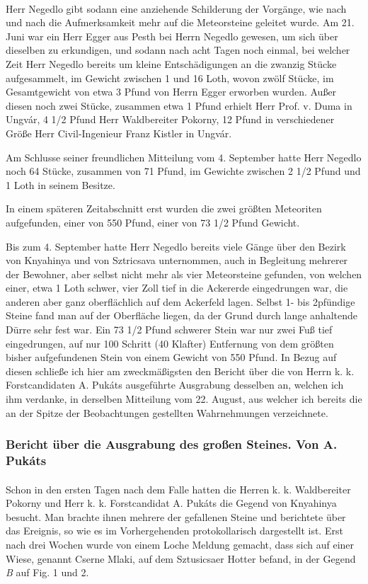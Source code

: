 \documentclass[a4paper, 11pt, oneside, german]{article}
\begin{document}
\paragraph{}
Herr Negedlo gibt sodann eine anziehende Schilderung der Vorgänge, wie nach und nach die Aufmerksamkeit mehr auf die Meteorsteine geleitet wurde. Am 21. Juni war ein Herr Egger aus Pesth bei Herrn Negedlo gewesen, um sich über dieselben zu erkundigen, und sodann nach acht Tagen noch einmal, bei welcher Zeit Herr Negedlo bereits um kleine Entschädigungen an die zwanzig Stücke aufgesammelt, im Gewicht zwischen 1 und 16 Loth, wovon zwölf Stücke, im Gesamtgewicht von etwa 3 Pfund von Herrn Egger erworben wurden. Außer diesen noch zwei Stücke, zusammen etwa 1 Pfund erhielt Herr Prof. v. Duma in Ungvár, 4 1/2 Pfund Herr Waldbereiter Pokorny, 12 Pfund in verschiedener Größe Herr Civil-Ingenieur Franz Kistler in Ungvár.

Am Schlusse seiner freundlichen Mitteilung vom 4. September hatte Herr Negedlo noch 64 Stücke, zusammen von 71 Pfund, im Gewichte zwischen 2 1/2 Pfund und 1 Loth in seinem Besitze.

In einem späteren Zeitabschnitt erst wurden die zwei größten Meteoriten aufgefunden, einer von 550 Pfund, einer von 73 1/2 Pfund Gewicht.

Bis zum 4. September hatte Herr Negedlo bereits viele Gänge über den Bezirk von Knyahinya und von Sztricsava unternommen, auch in Begleitung mehrerer der Bewohner, aber selbst nicht mehr als vier Meteorsteine gefunden, von welchen einer, etwa 1 Loth schwer, vier Zoll tief in die Ackererde eingedrungen war, die anderen aber ganz oberflächlich auf dem Ackerfeld lagen. Selbst 1- bis 2pfündige Steine fand man auf der Oberfläche liegen, da der Grund durch lange anhaltende Dürre sehr fest war. Ein 73 1/2 Pfund schwerer Stein war nur zwei Fuß tief eingedrungen, auf nur 100 Schritt (40 Klafter) Entfernung von dem größten bisher aufgefundenen Stein von einem Gewicht von 550 Pfund. In Bezug auf diesen schließe ich hier am zweckmäßigsten den Bericht über die von Herrn k. k. Forstcandidaten A. Pukáts ausgeführte Ausgrabung desselben an, welchen ich ihm verdanke, in derselben Mitteilung vom 22. August, aus welcher ich bereits die an der Spitze der Beobachtungen gestellten Wahrnehmungen verzeichnete.
\clearpage
\subsubsection{Bericht über die Ausgrabung des großen Steines. Von A. Pukáts}
\paragraph{}
Schon in den ersten Tagen nach dem Falle hatten die Herren k. k. Waldbereiter Pokorny und Herr k. k. Forstcandidat A. Pukáts die Gegend von Knyahinya besucht. Man brachte ihnen mehrere der gefallenen Steine und berichtete über das Ereignis, so wie es im Vorhergehenden protokollarisch dargestellt ist. Erst nach drei Wochen wurde von einem Loche Meldung gemacht, dass sich auf einer Wiese, genannt Cserne Mlaki, auf dem Sztusicsaer Hotter befand, in der Gegend \emph{B} auf Fig. 1 und 2.
\end{document}
